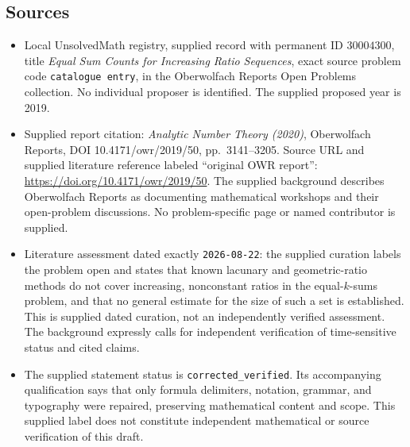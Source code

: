 \documentclass[11pt]{article}
\begin{document}
\subsection{Sources}
\begin{itemize}
\item Local UnsolvedMath registry, supplied record with permanent ID \(30004300\), title \emph{Equal Sum Counts for Increasing Ratio Sequences}, exact source problem code \texttt{catalogue entry}, in the Oberwolfach Reports Open Problems collection. No individual proposer is identified. The supplied proposed year is 2019.
\item Supplied report citation: \emph{Analytic Number Theory (2020)}, Oberwolfach Reports, DOI 10.4171/owr/2019/50, pp.\ 3141--3205. Source URL and supplied literature reference labeled ``original OWR report'': \url{https://doi.org/10.4171/owr/2019/50}. The supplied background describes Oberwolfach Reports as documenting mathematical workshops and their open-problem discussions. No problem-specific page or named contributor is supplied.
\item Literature assessment dated exactly \texttt{2026-08-22}: the supplied curation labels the problem open and states that known lacunary and geometric-ratio methods do not cover increasing, nonconstant ratios in the equal-\(k\)-sums problem, and that no general estimate for the size of such a set is established. This is supplied dated curation, not an independently verified assessment. The background expressly calls for independent verification of time-sensitive status and cited claims.
\item The supplied statement status is \texttt{corrected\_verified}. Its accompanying qualification says that only formula delimiters, notation, grammar, and typography were repaired, preserving mathematical content and scope. This supplied label does not constitute independent mathematical or source verification of this draft.
\end{itemize}
\end{document}
